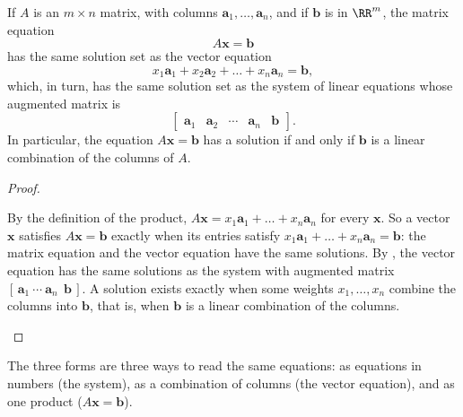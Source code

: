\documentclass[10pt]{scrartcl}
\newcommand{\vv}[1]{\mathbf{#1}}
\begin{document}
\begin{theorem*}
  If $A$ is an $m\times n$ matrix, with columns $\vv a_1,\dots,\vv a_n$, and if $\vv b$ is in $\RR^m$, the matrix equation
  \[
    A\vv x = \vv b
  \]
  has the same solution set as the vector equation
  \[
    x_1\vv a_1 + x_2\vv a_2 + \dots + x_n\vv a_n = \vv b,
  \]
  which, in turn, has the same solution set as the system of linear equations whose augmented matrix is
  \[
    \begin{bmatrix} \vv a_1 & \vv a_2 & \cdots & \vv a_n & \vv b \end{bmatrix}.
  \]
  In particular, the equation $A\vv x=\vv b$ has a solution if and only if $\vv b$ is a linear combination of the columns of $A$.
\end{theorem*}
\begin{proof}
  \begin{steps}
    \ii By the definition of the product, $A\vv x=x_1\vv a_1+\dots+x_n\vv a_n$ for every $\vv x$. So a vector $\vv x$ satisfies $A\vv x=\vv b$ exactly when its entries satisfy $x_1\vv a_1+\dots+x_n\vv a_n=\vv b$: the matrix equation and the vector equation have the same solutions.
    \ii By , the vector equation has the same solutions as the system with augmented matrix $[\,\vv a_1\ \cdots\ \vv a_n\ \ \vv b\,]$.
    \ii A solution exists exactly when some weights $x_1,\dots,x_n$ combine the columns into $\vv b$, that is, when $\vv b$ is a linear combination of the columns.
  \end{steps}
\end{proof}
The three forms are three ways to read the same equations: as equations in numbers (the system), as a combination of columns (the vector equation), and as one product ($A\vv x=\vv b$).
\end{document}
